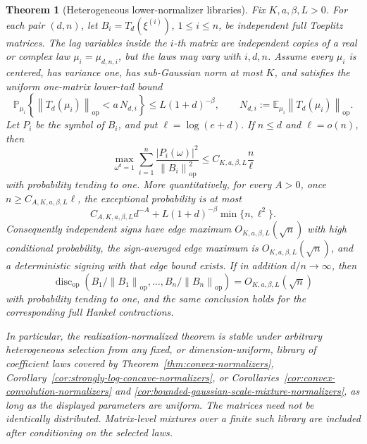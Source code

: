 \documentclass[11pt]{amsart}
\numberwithin{equation}{section}
\newtheorem{theorem}{Theorem}[section]
\theoremstyle{definition}
\theoremstyle{remark}
\newcommand{\op}{\mathrm{op}}
\newcommand{\discop}{\operatorname{disc}_{\op}}
\newcommand{\Prob}{\mathbb P}
\newcommand{\Exp}{\mathbb E}
\newcommand{\norm}[1]{\left\lVert #1\right\rVert}
\newcommand{\abs}[1]{\left\lvert #1\right\rvert}
\begin{document}
\begin{theorem}[Heterogeneous lower-normalizer libraries]
\label{thm:heterogeneous-normalizer-library}
Fix \(K,a,\beta,L>0\).  For each pair \((d,n)\), let
\(B_i=T_d(\xi^{(i)})\), \(1\le i\le n\), be independent full Toeplitz
matrices.  The lag variables inside the \(i\)-th matrix are independent copies
of a real or complex law \(\mu_i=\mu_{d,n,i}\), but the laws may vary with
\(i,d,n\).  Assume every \(\mu_i\) is centered, has variance one, has
sub-Gaussian norm at most \(K\), and satisfies the uniform one-matrix lower-tail
bound
\[
  \Prob_{\mu_i}\left\{\norm{T_d(\mu_i)}_{\op}
  < a\,N_{d,i}\right\}
  \le L(1+d)^{-\beta},
  \qquad
  N_{d,i}:=\Exp_{\mu_i}\norm{T_d(\mu_i)}_{\op}.
\]
Let \(P_i\) be the symbol of \(B_i\), and put \(\ell=\log(e+d)\).  If
\(n\le d\) and \(\ell=o(n)\), then
\[
  \max_{\omega^d=1}
  \sum_{i=1}^n
  \frac{\abs{P_i(\omega)}^2}{\norm{B_i}_{\op}^2}
  \le C_{K,a,\beta,L}\frac n\ell
\]
with probability tending to one.  More quantitatively, for every \(A>0\), once
\(n\ge C_{A,K,a,\beta,L}\ell\), the exceptional probability is at most
\[
  C_{A,K,a,\beta,L}d^{-A}
  +L(1+d)^{-\beta}\min\{n,\ell^2\}.
\]
Consequently independent signs have edge maximum \(O_{K,a,\beta,L}(\sqrt n)\)
with high conditional probability, the sign-averaged edge maximum is
\(O_{K,a,\beta,L}(\sqrt n)\), and a deterministic signing with that edge bound
exists.  If in addition \(d/n\to\infty\), then
\[
  \discop(B_1/\norm{B_1}_{\op},\ldots,B_n/\norm{B_n}_{\op})
  =O_{K,a,\beta,L}(\sqrt n)
\]
with probability tending to one, and the same conclusion holds for the
corresponding full Hankel contractions.

In particular, the realization-normalized theorem is stable under arbitrary
heterogeneous selection from any fixed, or dimension-uniform, library of
coefficient laws covered by Theorem~\ref{thm:convex-normalizers},
Corollary~\ref{cor:strongly-log-concave-normalizers}, or
Corollaries~\ref{cor:convex-convolution-normalizers} and
\ref{cor:bounded-gaussian-scale-mixture-normalizers}, as long as the displayed
parameters are uniform.  The matrices need not be identically distributed.
Matrix-level mixtures over a finite such library are included after conditioning
on the selected laws.
\end{theorem}
\end{document}
